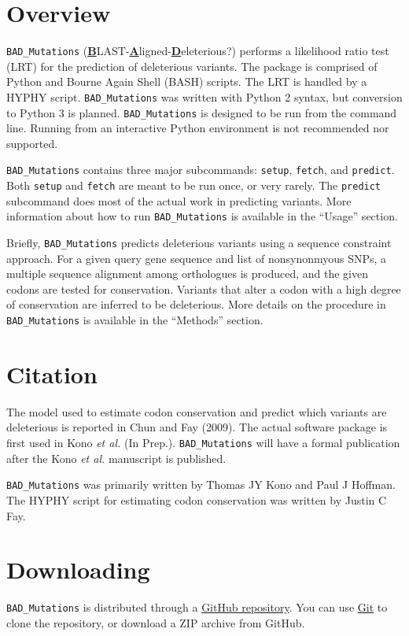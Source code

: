 \documentclass[12pt]{article}
\newcommand{\BM}{\texttt{BAD\_Mutations} }
\begin{document}
\section*{Overview}
\par \BM (\textbf{\underline{B}}LAST-\textbf{\underline{A}}ligned-\textbf{\underline{D}}eleterious?)
performs a likelihood ratio test (LRT) for the prediction of deleterious
variants. The package is comprised of Python and Bourne Again Shell (BASH) scripts.
The LRT is handled by a HYPHY script. \BM was written with Python 2 syntax, but
conversion to Python 3 is planned. \BM is designed to be run from the command
line. Running from an interactive Python environment is not recommended nor
supported.

\par \BM contains three major subcommands: \texttt{setup}, \texttt{fetch}, and
\texttt{predict}. Both \texttt{setup} and \texttt{fetch} are meant to be run
once, or very rarely. The \texttt{predict} subcommand does most of the actual
work in predicting variants. More information about how to run \BM is available
in the ``Usage'' section.

\par Briefly, \BM predicts deleterious variants using a sequence constraint
approach. For a given query gene sequence and list of nonsynonmyous SNPs, a
multiple sequence alignment among orthologues is produced, and the given codons
are tested for conservation. Variants that alter a codon with a high degree of
conservation are inferred to be deleterious. More details on the procedure in
\BM is available in the ``Methods'' section.

\section*{Citation}
\par The model used to estimate codon conservation and predict which variants
are deleterious is reported in Chun and Fay (2009). The actual software package
is first used in Kono \textit{et al.} (In Prep.). \BM will have a formal
publication after the Kono \textit{et al.} manuscript is published.

\par \BM was primarily written by Thomas JY Kono and Paul J Hoffman. The HYPHY
script for estimating codon conservation was written by Justin C Fay.

\section*{Downloading}
\par \BM is distributed through a
\href{https://github.com/MorrellLAB/BAD_Mutations}{GitHub repository}. You can
use \href{https://git-scm.com/}{Git} to clone the repository, or download a ZIP
archive from GitHub.
\end{document}

